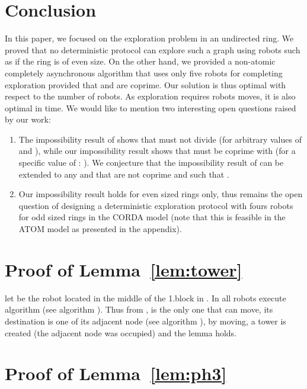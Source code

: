 \documentclass[12pt]{llncs}
\begin{document}
\section{Conclusion}
In this paper, we focused on the exploration problem in an undirected ring. We proved that no deterministic protocol can explore such a graph using  robots such as  if the ring is of even size. On the other hand, we provided a non-atomic completely asynchronous algorithm that uses only five robots for completing exploration provided that  and  are coprime. Our solution is thus optimal with respect to the number of robots. As exploration requires  robots moves, it is also optimal in time. We would like to mention two interesting open questions raised by our work:
\begin{enumerate}
\item The impossibility result of \cite{davi07} shows that  must not divide  (for arbitrary values of  and ), while our impossibility result shows that  must be coprime with  (for a specific value of : ). We conjecture that the impossibility result of \cite{davi07} can be extended to any  and  that are not coprime and such that . 
\item Our impossibility result holds for even sized rings only, thus remains the open question of designing a deterministic exploration protocol with fours robots for odd sized rings in the CORDA model (note that this is feasible in the ATOM model as presented in the appendix).
\end{enumerate}

{\small

 
}

\newpage

\appendix

\section{Proof of Lemma~\ref{lem:tower}}

let  be the robot located in the middle of the 1.block in . In  all robots execute algorithm  (see algorithm ). Thus from ,  is the only one that can move, its destination is one of its adjacent node (see algorithm ), by moving, a tower is created (the adjacent node was occupied) and the lemma holds. 

\section{Proof of Lemma~\ref{lem:ph3}}
\end{document}
